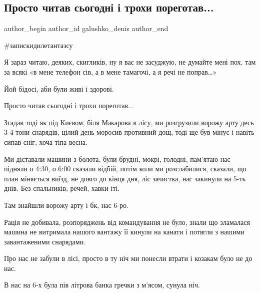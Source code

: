  
 
 
 
 

\subsection{Просто читав сьогодні і трохи пореготав...}
\label{sec:12_10_2022.fb.galushko_denis.1._prosto_chitav_sogod}

\ifcmt
 author_begin
   author_id galushko_denis
 author_end
\fi

\#запискидилетантазсу

Я зараз читаю, деяких, скигликів, ну я вас не засуджую, не думайте мені пох,
там за всякі «в мене телефон сів, а в мене тамагочі, а я речі не поправ…» 

Йой бідосі, аби були живі і здорові. 

Просто читав сьогодні і трохи пореготав...

Згадав тоді як під Києвом, біля Макарова в лісу, ми розгрузили  ворожу арту
десь 3-4 тони снарядів, цілий день моросив противний дощ, тоді ще був мінус
і навіть сипав сніг, хоча тіпа весна. 

Ми діставали машини з болота, були брудні, мокрі, голодні, пам'ятаю нас підняли
о 4:30, о 6:00 сказали відбій, потім коли ми розслабилися, сказали, що план
міняється виїзд, не довго до кінця дня, ліс зачистка, нас закинули на 5-ть
днів. Без спальників, речей, хавки іті. 

Там знайшли ворожу арту і бк, нас 6-ро.

Рація не добивала, розпоряджень від командування не було, знали що зламалася
машина не витримала нашого вантажу її кинули на канати і потягли з нашими
завантаженими снарядами. 

Про нас не забули в лісі, просто в ту ніч ми понесли втрати і козакам було не
до нас.

В нас на 6-х була пів літрова банка гречки з м'ясом, сунула ніч.

